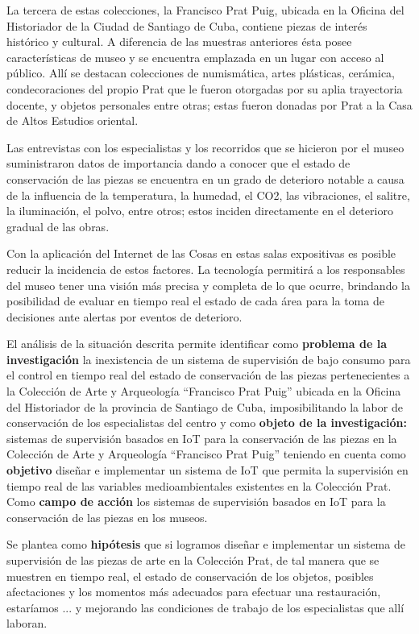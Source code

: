     La tercera de estas colecciones, la Francisco Prat Puig, ubicada en la Oficina del Historiador de la Ciudad de Santiago de Cuba, contiene piezas de interés histórico y cultural. A diferencia de las muestras anteriores ésta posee características de museo y se encuentra emplazada en un lugar con acceso al público. Allí se destacan colecciones de numismática, artes plásticas, cerámica, condecoraciones del propio Prat que le fueron otorgadas por su aplia trayectoria docente, y objetos personales entre otras; estas fueron donadas por Prat a la Casa de Altos Estudios oriental.

    Las entrevistas con los especialistas y los recorridos que se hicieron por el museo suministraron datos de importancia dando a conocer que el estado de conservación de las piezas se encuentra en un grado de deterioro notable a causa de la influencia de la temperatura, la humedad, el CO2, las vibraciones, el salitre, la iluminación, el polvo, entre otros; estos inciden directamente en el deterioro gradual de las obras.
    
    Con la aplicación del Internet de las Cosas en estas salas expositivas es posible reducir la incidencia de estos factores. La tecnología permitirá a los responsables del museo tener una visión más precisa y completa de lo que ocurre, brindando la posibilidad de evaluar en tiempo real el estado de cada área para la toma de decisiones ante alertas por eventos de deterioro.
    
    El análisis de la situación descrita permite identificar como \textbf{problema de la investigación} la inexistencia de un sistema de supervisión de bajo consumo para el control en tiempo real del estado de conservación de las piezas pertenecientes a la Colección de Arte y Arqueología “Francisco Prat Puig” ubicada en la Oficina del Historiador de la provincia de Santiago de Cuba, imposibilitando la labor de conservación de los especialistas del centro y como
    \textbf{objeto de la investigación:} sistemas de supervisión basados en IoT para la conservación de las piezas en la Colección de Arte y Arqueología “Francisco Prat Puig” teniendo en cuenta como \textbf{objetivo} diseñar e implementar un sistema de IoT que permita la supervisión en tiempo real de las variables medioambientales existentes en la Colección Prat. Como \textbf{campo de acción} los sistemas de supervisión basados en IoT para la conservación de las piezas en los museos.

    Se plantea como \textbf{hipótesis} que si logramos diseñar e implementar un sistema de supervisión de las piezas de arte en la Colección Prat, de tal manera que se muestren en tiempo real, el estado de conservación de los objetos, posibles afectaciones y los momentos más adecuados para efectuar una restauración, estaríamos ... y mejorando las condiciones de trabajo de los especialistas que allí laboran.\\
    
